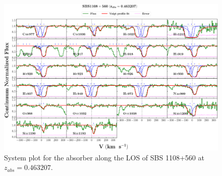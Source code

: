   
  
  \newpage
  
  \begin{landscape}
  
  \begin{figure}
      \centering
      \vspace{-20mm}
      \hspace*{-35mm}
      \includegraphics[width=1.25\linewidth]{System-Plots/SBS1108+560_z=0.463207_sys_plot.png}
      \caption{System plot for the absorber along the LOS of SBS 1108+560 at $z_{abs} = 0.463207$. }
  \end{figure}
  
  \end{landscape}
  
